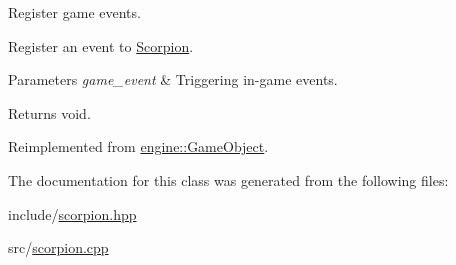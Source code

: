 Register game events. 

Register an event to \hyperlink{classmindscape_1_1_scorpion}{Scorpion}.


\begin{DoxyParams}{Parameters}
{\em game\+\_\+event} & Triggering in-\/game events. \\
\hline
\end{DoxyParams}
\begin{DoxyReturn}{Returns}
void. 
\end{DoxyReturn}


Reimplemented from \hyperlink{classengine_1_1_game_object}{engine\+::\+Game\+Object}.



The documentation for this class was generated from the following files\+:\begin{DoxyCompactItemize}
\item 
include/\hyperlink{scorpion_8hpp}{scorpion.\+hpp}\item 
src/\hyperlink{scorpion_8cpp}{scorpion.\+cpp}\end{DoxyCompactItemize}
